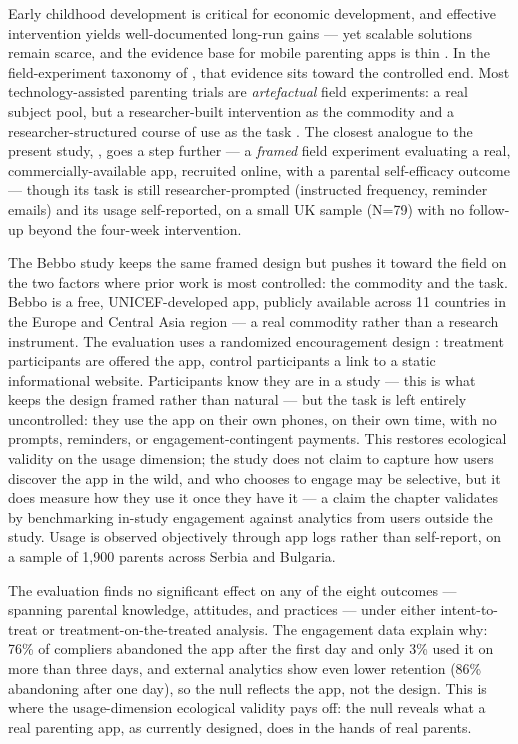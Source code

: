 Early childhood development is critical for economic development, and effective intervention yields well-documented long-run gains \citep{Black2018,Gertler2015,Attanasio2022} --- yet scalable solutions remain scarce, and the evidence base for mobile parenting apps is thin \citep{Dewitt2022}. In the field-experiment taxonomy of \citet{Harrison2004}, that evidence sits toward the controlled end. Most technology-assisted parenting trials are \emph{artefactual} field experiments: a real subject pool, but a researcher-built intervention as the commodity and a researcher-structured course of use as the task \citep{Hall2015}. The closest analogue to the present study, \citet{Outhwaite2023}, goes a step further --- a \emph{framed} field experiment evaluating a real, commercially-available app, recruited online, with a parental self-efficacy outcome --- though its task is still researcher-prompted (instructed frequency, reminder emails) and its usage self-reported, on a small UK sample (N=79) with no follow-up beyond the four-week intervention.

The Bebbo study keeps the same framed design but pushes it toward the field on the two factors where prior work is most controlled: the commodity and the task. Bebbo is a free, UNICEF-developed app, publicly available across 11 countries in the Europe and Central Asia region --- a real commodity rather than a research instrument. The evaluation uses a randomized encouragement design \citep{Moayyedi2014}: treatment participants are offered the app, control participants a link to a static informational website. Participants know they are in a study --- this is what keeps the design framed rather than natural --- but the task is left entirely uncontrolled: they use the app on their own phones, on their own time, with no prompts, reminders, or engagement-contingent payments. This restores ecological validity on the usage dimension; the study does not claim to capture how users discover the app in the wild, and who chooses to engage may be selective, but it does measure how they use it once they have it --- a claim the chapter validates by benchmarking in-study engagement against analytics from users outside the study. Usage is observed objectively through app logs rather than self-report, on a sample of 1{,}900 parents across Serbia and Bulgaria.

The evaluation finds no significant effect on any of the eight outcomes --- spanning parental knowledge, attitudes, and practices --- under either intent-to-treat or treatment-on-the-treated analysis. The engagement data explain why: 76\% of compliers abandoned the app after the first day and only 3\% used it on more than three days, and external analytics show even lower retention (86\% abandoning after one day), so the null reflects the app, not the design. This is where the usage-dimension ecological validity pays off: the null reveals what a real parenting app, as currently designed, does in the hands of real parents.

